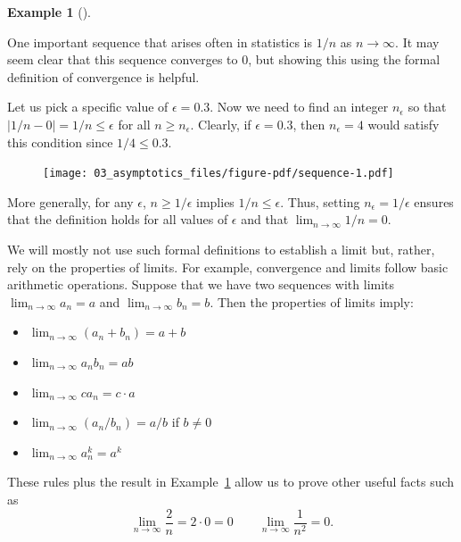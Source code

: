 \documentclass[
  letterpaper,
  DIV=11,
  numbers=noendperiod]{scrreprt}
\providecommand{\tightlist}{%
  \setlength{\itemsep}{0pt}\setlength{\parskip}{0pt}}\usepackage{longtable,booktabs,array}
\theoremstyle{plain}
\theoremstyle{definition}
\newtheorem{example}{Example}[chapter]
\theoremstyle{definition}
\theoremstyle{remark}
\begin{document}
\begin{example}[]\protect\hypertarget{exm-limit}{}\label{exm-limit}

One important sequence that arises often in statistics is \(1/n\) as
\(n\to\infty\). It may seem clear that this sequence converges to 0, but
showing this using the formal definition of convergence is helpful.

Let us pick a specific value of \(\epsilon = 0.3\). Now we need to find
an integer \(n_{\epsilon}\) so that \(|1/n - 0| = 1/n \leq \epsilon\)
for all \(n \geq n_{\epsilon}\). Clearly, if \(\epsilon = 0.3\), then
\(n_{\epsilon} = 4\) would satisfy this condition since
\(1/4 \leq 0.3\).

\begin{figure}[th]

{\centering \texttt{[image: 03\_asymptotics\_files/figure-pdf/sequence-1.pdf]}

}

\end{figure}

More generally, for any \(\epsilon\), \(n \geq 1/\epsilon\) implies
\(1/n \leq \epsilon\). Thus, setting \(n_{\epsilon} = 1/\epsilon\)
ensures that the definition holds for all values of \(\epsilon\) and
that \(\lim_{n\to\infty} 1/n = 0\).

\end{example}

We will mostly not use such formal definitions to establish a limit but,
rather, rely on the properties of limits. For example, convergence and
limits follow basic arithmetic operations. Suppose that we have two
sequences with limits \(\lim_{n\to\infty} a_n = a\) and
\(\lim_{n\to\infty} b_n = b\). Then the properties of limits imply:

\begin{itemize}
\tightlist
\item
  \(\lim_{n\to\infty} (a_n + b_n) = a + b\)
\item
  \(\lim_{n\to\infty} a_nb_n = ab\)
\item
  \(\lim_{n\to\infty} ca_n = c\cdot a\)
\item
  \(\lim_{n\to\infty} (a_n/b_n) = a/b\) if \(b \neq 0\)
\item
  \(\lim_{n\to\infty} a_n^{k} = a^{k}\)
\end{itemize}

These rules plus the result in Example~\ref{exm-limit} allow us to prove
other useful facts such as \[
\lim_{n\to\infty} \frac{2}{n} = 2 \cdot 0 = 0 \qquad  \lim_{n\to\infty} \frac{1}{n^{2}} = 0.
\]
\end{document}
